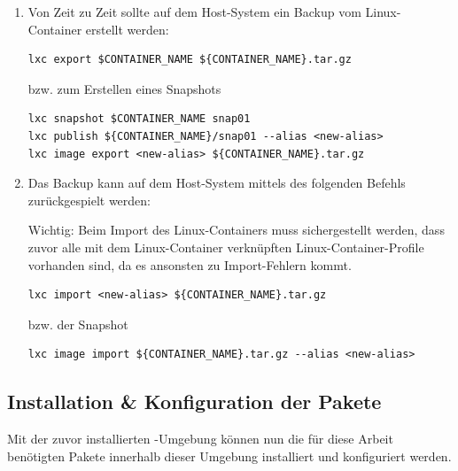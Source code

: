 \begin{enumerate}[label*=\arabic*.]
    \item Von Zeit zu Zeit sollte auf dem Host-System ein Backup vom Linux-Container erstellt werden:
        \begin{lstlisting}[style=bash]
lxc export $CONTAINER_NAME ${CONTAINER_NAME}.tar.gz
        \end{lstlisting}

        bzw. zum Erstellen eines Snapshots

        \begin{lstlisting}[style=bash]
lxc snapshot $CONTAINER_NAME snap01
lxc publish ${CONTAINER_NAME}/snap01 --alias <new-alias>
lxc image export <new-alias> ${CONTAINER_NAME}.tar.gz
        \end{lstlisting}

    \item Das Backup kann auf dem Host-System mittels des folgenden Befehls zurückgespielt werden:
        \begin{redbox}{Wichtig:}
            Beim Import des Linux-Containers muss sichergestellt werden, dass zuvor alle mit dem Linux-Container verknüpften Linux-Container-Profile vorhanden sind, da es ansonsten zu Import-Fehlern kommt.
        \end{redbox}

        \begin{lstlisting}[style=bash]
lxc import <new-alias> ${CONTAINER_NAME}.tar.gz
        \end{lstlisting}

        bzw. der Snapshot

        \begin{lstlisting}[style=bash]
lxc image import ${CONTAINER_NAME}.tar.gz --alias <new-alias>
        \end{lstlisting}
\end{enumerate}


\subsection{Installation \& Konfiguration der Pakete}\label{appendix1.2:Installation_und_Konfiguration_der_Pakete}
Mit der zuvor installierten -Umgebung können nun die für diese Arbeit benötigten Pakete innerhalb dieser Umgebung installiert und konfiguriert werden.

